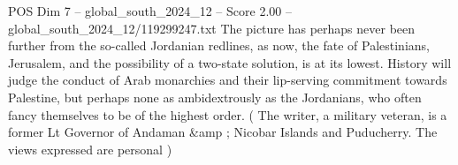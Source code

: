 \begin{textsample}{POS Dim 7 – global\_south\_2024\_12 – Score 2.00 – global\_south\_2024\_12/119299247.txt}
The picture has perhaps never been further from the so-called Jordanian redlines, as now, the fate of Palestinians, Jerusalem, and the possibility of a two-state solution, is at its lowest.
History will judge the conduct of Arab monarchies and their lip-serving commitment towards Palestine, but perhaps none as ambidextrously as the Jordanians, who often fancy themselves to be of the highest order. ( The writer, a military veteran, is a former Lt Governor of Andaman \&amp ; Nicobar Islands and Puducherry.
The views expressed are personal )

\end{textsample}
